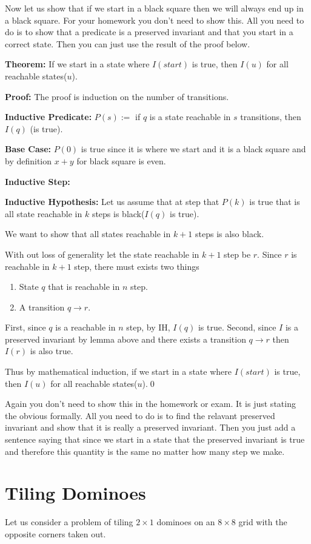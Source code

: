 \documentclass[a4paper, 12pt]{article}
\newcommand{\theorem}{\vspace{1em}\noindent\textbf{Theorem:} }
\newcommand{\predicate}{\vspace{0.25em}\noindent\textbf{Inductive Predicate:} }
\newcommand{\inductivestep}{\vspace{0.25em}\noindent\textbf{Inductive Step:} }
\renewcommand{\proof}{\vspace{0.5em}\noindent\textbf{Proof:} }
\newcommand{\basecase}{\vspace{0.25em}\noindent\textbf{Base Case:} }
\newcommand{\inductivehypothesis}{\vspace{0.25em}\noindent\textbf{Inductive Hypothesis:} }
\newcommand{\qedd}{\qed\newline}
\theoremstyle{examplestyle}
\begin{document}
\begin{multicols}{2}
Now let us show that if we start in a black square then we will always end up in a black square. For your homework you don't need to show this. All you need to do is to show that a predicate is a preserved invariant and that you start in a correct state. Then you can just use the result of the proof below.

\theorem If we start in a state where $I(start)$ is true, then $I(u)$ for all reachable states($u$).

\proof The proof is induction on the number of transitions.

\predicate $P(s):=$ if $q$ is a state reachable in $s$ transitions, then $I(q)$ (is true).

\basecase $P(0)$ is true since it is where we start and it is a black square and by definition $x+y$ for black square is even.\checkmark

\inductivestep

\inductivehypothesis Let us assume that at step that $P(k)$ is true that is all state reachable in $k$ steps is black($I(q)$ is true).

We want to show that all states reachable in $k+1$ steps is also black.

With out loss of generality let the state reachable in $k+1$ step be $r$. Since $r$ is reachable in $k+1$ step, there must exists two things
\begin{enumerate}[1)]
	\item State $q$ that is reachable in $n$ step.
	\item A transition $q\to r$.
\end{enumerate}

First, since $q$ is a reachable in $n$ step, by IH, $I(q)$ is true. Second, since $I$ is a preserved invariant by lemma above and there exists a transition $q \to r$ then $I(r)$ is also true.

Thus by mathematical induction, if we start in a state where $I(start)$ is true, then $I(u)$ for all reachable states($u$).\qedd

Again you don't need to show this in the homework or exam. It is just stating the obvious formally. All you need to do is to find the relavant preserved invariant and show that it is really a preserved invariant. Then you just add a sentence saying that since we start in a state that the preserved invariant is true and therefore this quantity is the same no matter how many step we make.

\section*{Tiling Dominoes}
Let us consider a problem of tiling $2\times 1$ dominoes on an $8\times 8$ grid with the opposite corners taken out.


\end{multicols}
\end{document}
